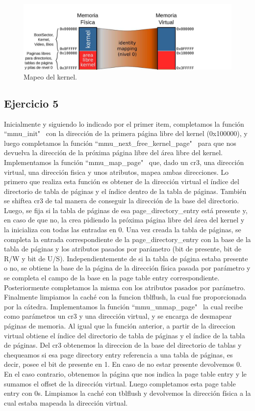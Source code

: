 \documentclass[a4paper]{article}
\begin{document}
\begin{figure}[h]
	\centering
	\includegraphics[scale=0.5]{img/MapearKernel.pdf}
	\caption{Mapeo del kernel.}
\end{figure}

\subsection{Ejercicio 5}
\justify
Inicialmente y siguiendo lo indicado por el primer item, completamos la función ``mmu_init" \ con la dirección de la primera página libre del kernel (0x100000), y luego completamos la función ``mmu_next_free_kernel_page" \ para que nos devuelva la dirección de la próxima página libre del área libre del kernel.
\justify
Implementamos la función ``mmu_map_page" \ que, dado un cr3, una dirección virtual, una dirección fisica y unos atributos, mapea ambas direcciones. Lo primero que realiza esta función es obtener de la dirección virtual el índice del directorio de tabla de páginas y el índice dentro de la tabla de páginas. También se shiftea cr3 de tal manera de conseguir la dirección de la base del directorio. Luego, se fija si la tabla de páginas de esa page_directory_entry está presente y, en caso de que no, la crea pidiendo la próxima página libre del área del kernel y la inicializa con todas las entradas en 0. Una vez creada la tabla de páginas, se completa la entrada correspondiente de la page_directory_entry con la base de la tabla de páginas y los atributos pasados por parámetro (bit de presente, bit de R/W y bit de U/S). Independientemente de si la tabla de página estaba presente o no, se obtiene la base de la página de la dirección física pasada por parámetro y se completa el campo de la base en la page table entry correspondiente. Posteriormente completamos la misma con los atributos pasados por parámetro. Finalmente limpiamos la caché con la funcion tblflush, la cual fue proporcionada por la cátedra.
\justify
Implementamos la función ``mmu_unmap_page" \, la cual recibe como parámetros un cr3 y una dirección virtual, y se encarga de desmapear páginas de memoria. Al igual que la función anterior, a partir de la direccion virtual obtiene el índice del directorio de tabla de páginas y el índice de la tabla de páginas. Del cr3 obtenemos la direccion de la base del directorio de tablas y chequeamos si esa page directory entry referencia a una tabla de páginas, es decir, posee el bit de presente en 1. En caso de no estar presente devolvemos 0. En el caso contrario, obtenemos la página que nos indica la page table entry y le sumamos el offset de la dirección virtual. Luego completamos esta page table entry con 0s. Limpiamos la caché con tblflush y devolvemos la dirección física a la cual estaba mapeada la dirección virtual.
\end{document}
